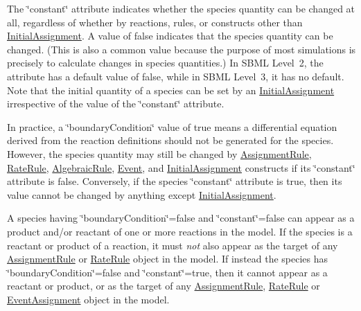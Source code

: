 The \char`\"{}constant\char`\"{} attribute indicates whether the species\textquotesingle{} quantity can be changed at all, regardless of whether by reactions, rules, or constructs other than \hyperlink{class_initial_assignment}{Initial\+Assignment}. A value of {\ttfamily false} indicates that the species\textquotesingle{} quantity can be changed. (This is also a common value because the purpose of most simulations is precisely to calculate changes in species quantities.) In S\+B\+ML Level~2, the attribute has a default value of {\ttfamily false}, while in S\+B\+ML Level~3, it has no default. Note that the initial quantity of a species can be set by an \hyperlink{class_initial_assignment}{Initial\+Assignment} irrespective of the value of the \char`\"{}constant\char`\"{} attribute.

In practice, a \char`\"{}boundary\+Condition\char`\"{} value of {\ttfamily true} means a differential equation derived from the reaction definitions should not be generated for the species. However, the species\textquotesingle{} quantity may still be changed by \hyperlink{class_assignment_rule}{Assignment\+Rule}, \hyperlink{class_rate_rule}{Rate\+Rule}, \hyperlink{class_algebraic_rule}{Algebraic\+Rule}, \hyperlink{class_event}{Event}, and \hyperlink{class_initial_assignment}{Initial\+Assignment} constructs if its \char`\"{}constant\char`\"{} attribute is {\ttfamily false}. Conversely, if the species\textquotesingle{} \char`\"{}constant\char`\"{} attribute is {\ttfamily true}, then its value cannot be changed by anything except \hyperlink{class_initial_assignment}{Initial\+Assignment}.

A species having \char`\"{}boundary\+Condition\char`\"{}={\ttfamily false} and \char`\"{}constant\char`\"{}={\ttfamily false} can appear as a product and/or reactant of one or more reactions in the model. If the species is a reactant or product of a reaction, it must {\itshape not} also appear as the target of any \hyperlink{class_assignment_rule}{Assignment\+Rule} or \hyperlink{class_rate_rule}{Rate\+Rule} object in the model. If instead the species has \char`\"{}boundary\+Condition\char`\"{}={\ttfamily false} and \char`\"{}constant\char`\"{}={\ttfamily true}, then it cannot appear as a reactant or product, or as the target of any \hyperlink{class_assignment_rule}{Assignment\+Rule}, \hyperlink{class_rate_rule}{Rate\+Rule} or \hyperlink{class_event_assignment}{Event\+Assignment} object in the model.

